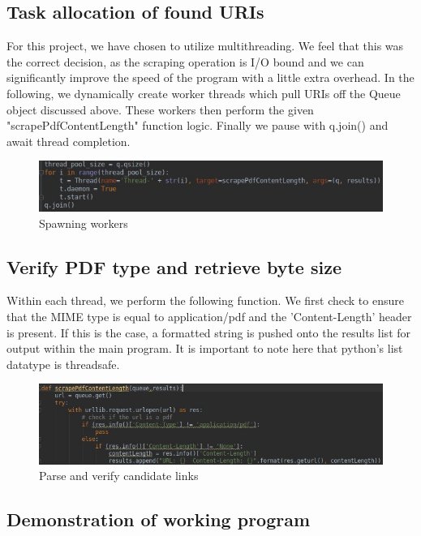\documentclass[11pt]{article}
\begin{document}
		\subsection{Task allocation of found URIs}
			\hspace{10mm}For this project, we have chosen to utilize multithreading. We feel
			that this was the correct decision, as the scraping operation is I/O bound and 
			we can significantly improve the speed of the program with a little extra overhead. In the following, we dynamically create worker threads which pull URIs off the Queue object discussed above. These workers then perform the given "scrapePdfContentLength" function logic. Finally we pause with q.join() and await thread completion. 
			\begin{figure}[H]
				\includegraphics[scale=0.7]{resources/multithread.jpg}
				\caption{Spawning workers}
			\end{figure}
		\subsection{Verify PDF type and retrieve byte size}
			\hspace{10mm}Within each thread, we perform the following function. We first check to 
			ensure that the MIME type is equal to application/pdf and the 'Content-Length' header is
			present.  If this is the case, a formatted string is pushed onto the results list for output within the main program. It is important to note here that python's list datatype is threadsafe. 
			\begin{figure}[H]
				\includegraphics[scale=0.6]{resources/pdfCheck.jpg}
				\caption{Parse and verify candidate links}
			\end{figure}
		\subsection{Demonstration of working program}
\end{document}
